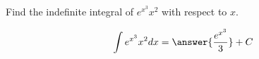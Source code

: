 \documentclass{ximera}
\author{Gregory Hartman \and Matthew Carr}
\begin{document}
\begin{exercise}

Find the indefinite integral of $e^{x^3} x^2$ with respect to $x$.

\[
\int e^{x^3} x^2 dx=\answer{\frac{e^{x^3}}{3}}+C
\]

\end{exercise}
\end{document}
